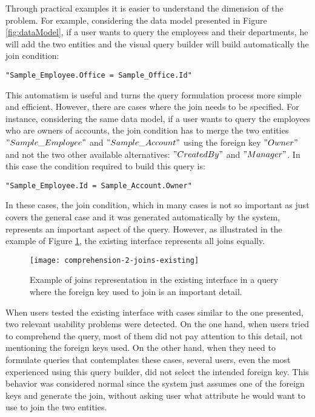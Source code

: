 Through practical examples it is easier to understand the dimension of the problem. For example, considering the data model presented in Figure \ref{fig:dataModel}, if a user wants to query the employees and their departments, he will add the two entities and the visual query builder will build automatically the join condition:

\begin{center}
  \verb|"Sample_Employee.Office = Sample_Office.Id"|
\end{center}

This automatism is useful and turns the query formulation process more simple and efficient. However, there are cases where the join needs to be specified. For instance, considering the same data model, if a user wants to query the employees who are owners of accounts, the join condition has to merge the two entities $"Sample\_Employee"$ and $"Sample\_Account"$ using the foreign key $"Owner"$ and not the two other available alternatives: $"CreatedBy"$ and $"Manager"$. In this case the condition required to build this query is:

\begin{center}
  \verb|"Sample_Employee.Id = Sample_Account.Owner"|
\end{center}

In these cases, the join condition, which in many cases is not so important as just covers the general case and it was generated automatically by the system, represents an important aspect of the query. However, as illustrated in the example of Figure \ref{fig:comprehension2JoinsExisting}, the existing interface represents all joins equally.

\begin{figure}[htbp]
	\centering
	\texttt{[image: comprehension-2-joins-existing]}
	\caption{Example of joins representation in the existing interface in a query where the foreign key used to join is an important detail.}
	\label{fig:comprehension2JoinsExisting}
\end{figure}

When users tested the existing interface with cases similar to the one presented, two relevant usability problems were detected. On the one hand, when users tried to comprehend the query, most of them did not pay attention to this detail, not mentioning the foreign keys used. On the other hand, when they need to formulate queries that contemplates these cases, several users, even the most experienced using this query builder, did not select the intended foreign key. This behavior was considered normal since the system just assumes one of the foreign keys and generate the join, without asking user what attribute he would want to use to join the two entities.

